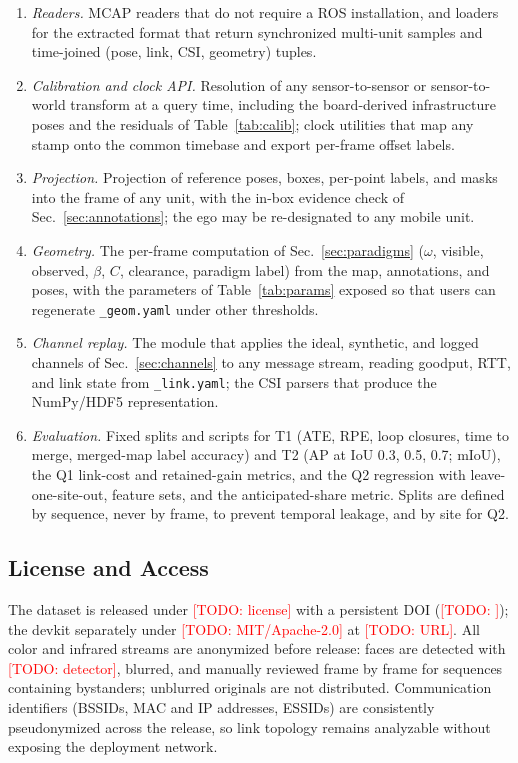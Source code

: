 \documentclass[conference]{IEEEtran}
\newcommand{\todo}[1]{\textcolor{red}{[TODO: #1]}}
\begin{document}
\begin{enumerate}
\item \emph{Readers.} MCAP readers that do not require a ROS
installation, and loaders for the extracted format that return
synchronized multi-unit samples and time-joined (pose, link, CSI,
geometry) tuples.
\item \emph{Calibration and clock API.} Resolution of any
sensor-to-sensor or sensor-to-world transform at a query time,
including the board-derived infrastructure poses and the residuals of
Table~\ref{tab:calib}; clock utilities that map any stamp onto the
common timebase and export per-frame offset labels.
\item \emph{Projection.} Projection of reference poses, boxes,
per-point labels, and masks into the frame of any unit, with the
in-box evidence check of Sec.~\ref{sec:annotations}; the ego may be
re-designated to any mobile unit.
\item \emph{Geometry.} The per-frame computation of
Sec.~\ref{sec:paradigms} ($\omega$, visible, observed, $\beta$, $C$,
clearance, paradigm label) from the map, annotations, and poses, with
the parameters of Table~\ref{tab:params} exposed so that users can
regenerate \texttt{\_geom.yaml} under other thresholds.
\item \emph{Channel replay.} The module that applies the ideal,
synthetic, and logged channels of Sec.~\ref{sec:channels} to any
message stream, reading goodput, RTT, and link state from
\texttt{\_link.yaml}; the CSI parsers that produce the NumPy/HDF5
representation.
\item \emph{Evaluation.} Fixed splits and scripts for T1 (ATE, RPE,
loop closures, time to merge, merged-map label accuracy) and T2 (AP
at IoU 0.3, 0.5, 0.7; mIoU), the Q1 link-cost and retained-gain
metrics, and the Q2 regression with leave-one-site-out, feature sets,
and the anticipated-share metric. Splits are defined by sequence,
never by frame, to prevent temporal leakage, and by site for Q2.
\end{enumerate}

\subsection{License and Access}
The dataset is released under \todo{license} with a persistent DOI
(\todo{}); the devkit separately under \todo{MIT/Apache-2.0} at
\todo{URL}. All color and infrared streams are anonymized before
release: faces are detected with \todo{detector}, blurred, and
manually reviewed frame by frame for sequences containing bystanders;
unblurred originals are not distributed. Communication identifiers
(BSSIDs, MAC and IP addresses, ESSIDs) are consistently pseudonymized
across the release, so link topology remains analyzable without
exposing the deployment network.
\end{document}
